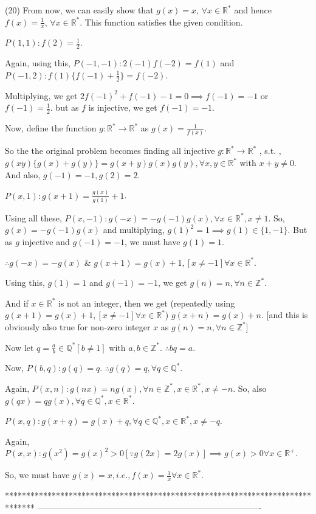 \begin{solution}
(20)\] From now, we can easily show that $g(x)=x,\, \forall x \in \mathbb R^*$ and hence $f(x)=\frac{1}{x},\, \forall x \in \mathbb R^*.$ This function satisfies the given condition.
\end{solution}



\begin{solution}
	$P(1, 1) : f(2) = \frac{1}{2}$.

Again, using this, $P(-1, -1) : 2(-1)f(-2)=f(1)$ and $P(-1, 2) : f(1) \{ f(-1)+ \frac{1}{2} \} = f(-2)$.

Multiplying, we get $2f(-1)^2 + f(-1) - 1 = 0 \implies f(-1) = -1$ or $f(-1)=\frac{1}{2}$. but as $f$ is injective, we get $f(-1)=-1$.

Now, define the function $g : \mathbb{R}^* \to \mathbb{R}^*$ as $g(x) = \frac{1}{f(x)}$.

So the the original problem becomes finding all injective $g : \mathbb{R}^* \to \mathbb{R}^*$ , s.t. , $g(xy)\{g(x)+g(y)\}=g(x+y)g(x)g(y), \forall x, y \in \mathbb{R}^*$ with $x+y \neq 0$. And also, $g(-1) =-1, g(2) = 2$.

$P(x, 1) : g(x+1) = \frac{g(x)}{g(1)}+1$.

Using all these, $P(x, -1) : g(-x) = -g(-1)g(x), \forall x \in \mathbb{R}^*, x \neq 1$.
So, $g(x)=-g(-1)g(x)$ and multiplying, $g(1)^2=1 \implies g(1) \in \{1, -1 \}$. But as $g$ injective and $g(-1)=-1$, we must have $g(1)=1$.

$\therefore g(-x)=-g(x)$ & $g(x+1) = g(x)+1, [x\neq -1] \forall x \in \mathbb{R}^*$.

Using this, $g(1)=1$ and $g(-1)=-1$, we get $g(n)=n, \forall n \in \mathbb{Z}^*$.

And if $x \in \mathbb{R}^*$ is not an integer, then we get (repeatedly using $g(x+1) = g(x)+1, [x\neq -1] \forall x \in \mathbb{R}^*$) $g(x+n)=g(x)+n$. [and this is obviously also true for non-zero integer $x$ as $g(n)=n, \forall n \in \mathbb{Z}^*$]

Now let $q = \frac{a}{b} \in \mathbb{Q}^* [b \neq 1]$ with $a, b \in \mathbb{Z}^*$. $\therefore bq = a$.

Now, $P(b, q) : g(q) = q$. $\therefore g(q) = q, \forall q \in \mathbb{Q}^*$.

Again, $P(x, n) : g(nx) = ng(x), \forall n \in \mathbb{Z}^*, x \in \mathbb{R}^*, x \neq - n$. So, also $g(qx) = qg(x), \forall q \in \mathbb{Q}^*, x \in \mathbb{R}^*$.

$P(x, q) : g(x+q) = g(x)+q, \forall q \in \mathbb{Q}^*, x \in \mathbb{R}^*, x \neq -q$.

Again, $P(x, x) : g(x^2) = g(x)^2 > 0 [\because g(2x)=2g(x)] \implies g(x) > 0 \forall x \in \mathbb{R}^+$.

So, we must have  $g(x)=x, i.e. , \boxed{f(x) =\frac{1}{x}} \forall x \in \mathbb{R}^*$.
\end{solution}
*******************************************************************************
-------------------------------------------------------------------------------

